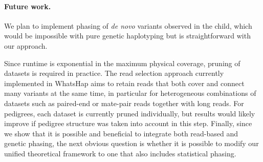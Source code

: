 \paragraph{Future work.}
We plan to implement phasing of \emph{de novo} variants observed in the child, which would be impossible with pure genetic haplotyping but is straightforward with our approach.

Since runtime is exponential in the maximum physical coverage, pruning of datasets is required in practice.
The read selection approach currently implemented in WhatsHap \citep{Fischer2016} aims to retain reads that both cover and connect many variants at the same time, in particular for heterogeneous combinations of datasets such as paired-end or mate-pair reads together with long reads.
For pedigrees, each dataset is currently pruned individually, but results would likely improve if pedigree structure was taken into account in this step.
Finally, since we show that it is possible and beneficial to integrate both read-based and genetic phasing, the next obvious question is whether it is possible to modify our unified theoretical framework to one that also includes statistical phasing.






